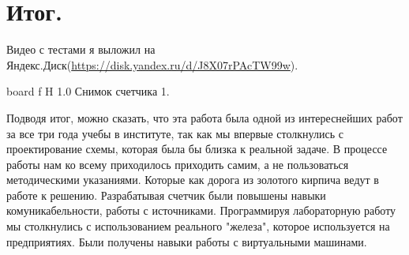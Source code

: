 \documentclass{bmstu}
\begin{document}
	\section{Итог.}
	
	\begin{flushleft}
		Видео с тестами я выложил на Яндекс.Диск(\underline{https://disk.yandex.ru/d/J8X07rPAcTW99w}).
	\end{flushleft}
	
	{board}
	{f} %
	{H} %
	{1.0\textwidth} %
	{Снимок счетчика 1.} %
	
	\begin{flushleft}
		Подводя итог, можно сказать, что эта работа была одной из интереснейших работ за все три года учебы в институте,
		так как мы впервые столкнулись с проектирование схемы, которая была бы близка к реальной задаче. 
		В процессе работы нам ко всему приходилось приходить самим, а не пользоваться методическими указаниями. 
		Которые как дорога из золотого кирпича ведут в работе к решению. Разрабатывая счетчик были повышены навыки комуникабельности, работы с источниками. 
		Программируя лабораторную работу мы столкнулись с использованием реального "железа", которое используется на предприятиях. 
		Были получены навыки работы с виртуальными машинами.  
	\end{flushleft}
\end{document}
